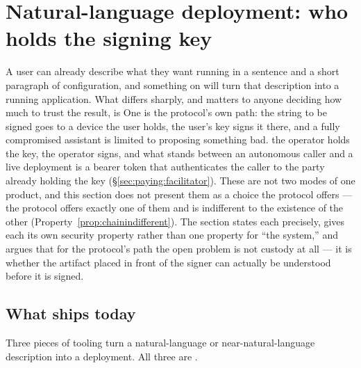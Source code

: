 \section{Natural-language deployment: who holds the signing key}
\label{sec:nl-deployment}

A user can already describe what they want running in a sentence and a short paragraph
of configuration, and something on \Flux will turn that description into a running
application. What differs sharply, and matters to anyone deciding how much to trust the
result, is  One is the protocol's own path: the string to be signed goes to a
device the user holds, the user's key signs it there, and a fully compromised assistant
is limited to proposing something bad. 
the operator holds the key, the operator signs, and what stands between an autonomous
caller and a live deployment is a bearer token that authenticates the caller to the party
already holding the key (\S\ref{sec:paying:facilitator}). These are not two modes of one
product, and this section does not present them as a choice the protocol offers — the
protocol offers exactly one of them and is indifferent to the existence of the other
(Property~\ref{prop:chainindifferent}). The section states each precisely, gives each its
own security property rather than one property for ``the system,'' and argues that for
the protocol's path the open problem is not custody at all — it is whether the artifact
placed in front of the signer can actually be understood before it is signed.

\subsection{What ships today}

Three pieces of tooling turn a natural-language or near-natural-language description into
a deployment. All three are \shipped.

